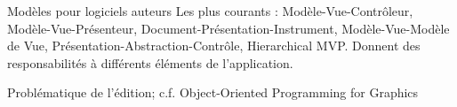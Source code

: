 \begin{block}{Modèles pour logiciels auteurs}
	Les plus courants : Modèle-Vue-Contrôleur, Modèle-Vue-Présenteur, Document-Présentation-Instrument, Modèle-Vue-Modèle de Vue, Présentation-Abstraction-Contrôle, Hierarchical MVP.
	Donnent des responsabilités à différents éléments de l'application.

	Problématique de l'édition; c.f. Object-Oriented Programming for Graphics

\end{block}